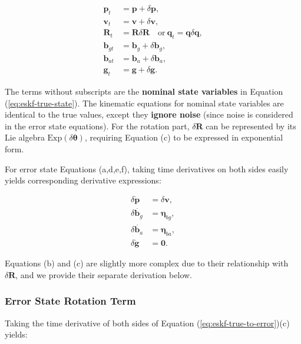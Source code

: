 \begin{subequations}\label{eq:eskf-true-to-error}
	\begin{align}
		\mathbf{p}_t &= \mathbf{p} + \delta \mathbf{p}, \\
		\mathbf{v}_t &= \mathbf{v} + \delta \mathbf{v}, \\
		\mathbf{R}_t &= \mathbf{R} \delta \mathbf{R} \quad \text{or} \ \mathbf{q}_t = \mathbf{q} \delta \mathbf{q}, \\
		\mathbf{b}_{gt} &= \mathbf{b}_g + \delta \mathbf{b}_g, \\
		\mathbf{b}_{at} &= \mathbf{b}_a + \delta \mathbf{b}_a, \\
		\mathbf{g}_t &= \mathbf{g} + \delta \mathbf{g}.
	\end{align}
\end{subequations}

The terms without subscripts are the \textbf{nominal state variables} in Equation (\ref{eq:eskf-true-state}). The kinematic equations for nominal state variables are identical to the true values, except they \textbf{ignore noise} (since noise is considered in the error state equations). For the rotation part, $\delta \mathbf{R}$ can be represented by its Lie algebra $\mathrm{Exp}(\delta \boldsymbol{\theta})$, requiring Equation (c) to be expressed in exponential form.

For error state Equations (a,d,e,f), taking time derivatives on both sides easily yields corresponding derivative expressions:

\begin{subequations}
	\begin{align}
		\delta \dot{\mathbf{p}} &= \delta \mathbf{v}, \\
		\delta \dot{\mathbf{b}_g} &= \boldsymbol{\eta}_{bg}, \\
		\delta \dot{\mathbf{b}_a} &= \boldsymbol{\eta}_{ba}, \\
		\delta \dot{\mathbf{g}} &= \mathbf{0}.
	\end{align}
\end{subequations}

Equations (b) and (c) are slightly more complex due to their relationship with $\delta \mathbf{R}$, and we provide their separate derivation below.

\subsubsection{Error State Rotation Term}
Taking the time derivative of both sides of Equation (\ref{eq:eskf-true-to-error})(c) yields:

